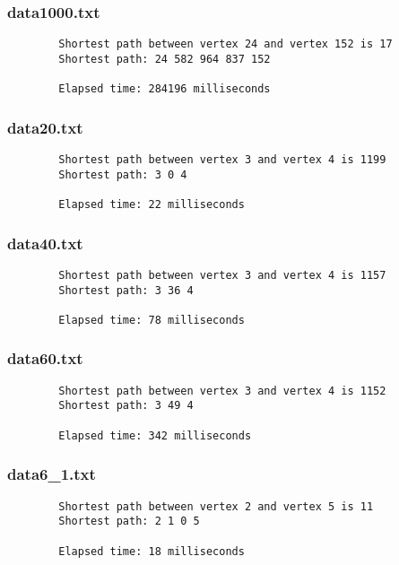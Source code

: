 \documentclass{article}
\begin{document}
    \subsubsection*{data1000.txt}
    \begin{verbatim}
        Shortest path between vertex 24 and vertex 152 is 17
        Shortest path: 24 582 964 837 152

        Elapsed time: 284196 milliseconds
    \end{verbatim}

    \subsubsection*{data20.txt}
    \begin{verbatim}
        Shortest path between vertex 3 and vertex 4 is 1199
        Shortest path: 3 0 4

        Elapsed time: 22 milliseconds
    \end{verbatim}

    \subsubsection*{data40.txt}
    \begin{verbatim}
        Shortest path between vertex 3 and vertex 4 is 1157
        Shortest path: 3 36 4

        Elapsed time: 78 milliseconds
    \end{verbatim}

    \subsubsection*{data60.txt}
    \begin{verbatim}
        Shortest path between vertex 3 and vertex 4 is 1152
        Shortest path: 3 49 4

        Elapsed time: 342 milliseconds
    \end{verbatim}

    \subsubsection*{data6\_1.txt}
    \begin{verbatim}
        Shortest path between vertex 2 and vertex 5 is 11
        Shortest path: 2 1 0 5

        Elapsed time: 18 milliseconds
    \end{verbatim}
\end{document}
